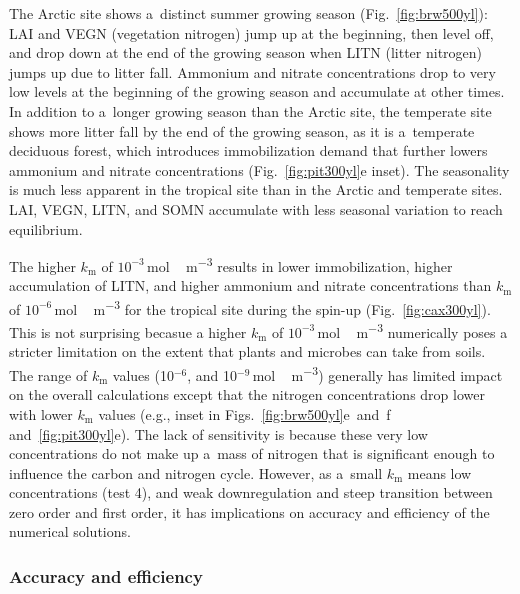 \documentclass[gmd,noline]{copernicus}
\begin{document}
      The Arctic site shows a~distinct summer growing season
      (Fig.~\ref{fig:brw500yl}): LAI and VEGN (vegetation nitrogen) jump up
      at the beginning, then level off, and drop down at the end of the
      growing season when LITN (litter nitrogen) jumps up due to litter
      fall.  Ammonium and nitrate concentrations drop to very low levels at
      the beginning of the growing season and accumulate at other times. In
      addition to a~longer growing season than the Arctic site, the
      temperate site shows more litter fall by the end of the growing
      season, as it is a~temperate deciduous forest, which introduces
      immobilization demand that further lowers ammonium and nitrate
      concentrations (Fig.~\ref{fig:pit300yl}e inset). The seasonality is
      much less apparent in the tropical site than in the Arctic and
      temperate sites. LAI, VEGN, LITN, and SOMN accumulate with less
      seasonal variation to reach equilibrium.

      The higher $k_\mathrm{m}$ of
      $10^{-3}$\,\unit{mol\,m^{-3}} results in lower immobilization, higher
      accumulation of LITN, and higher ammonium and nitrate concentrations
      than $k_\mathrm{m}$ of $10^{-6}$\,\unit{mol\,m^{-3}} for the tropical site
      during the spin-up (Fig.~\ref{fig:cax300yl}). This is not surprising becasue
      a higher $k_\mathrm{m}$ of $10^{-3}$\,\unit{mol\,m^{-3}} numerically poses
      a stricter limitation on the extent that plants and microbes can take from soils.
      The range of
      $k_\mathrm{m}$ values (10$^{-6}$, and 10$^{-9}$\,\unit{mol\,m^{-3}})
      generally has limited impact on the overall calculations except that
      the nitrogen concentrations drop lower with lower $k_\mathrm{m}$
      values (e.g., inset in Figs.~\ref{fig:brw500yl}e~and~f
      and~\ref{fig:pit300yl}e). The lack of sensitivity is because these
      very low concentrations do not make up a~mass of nitrogen that is
      significant enough to influence the carbon and nitrogen cycle.
      However, as a~small $k_\mathrm{m}$ means low concentrations (test 4),
      and weak downregulation and steep transition between zero order and
      first order, it has implications on accuracy and efficiency of the
      numerical solutions.



\subsubsection{Accuracy and efficiency}%
\end{document}
